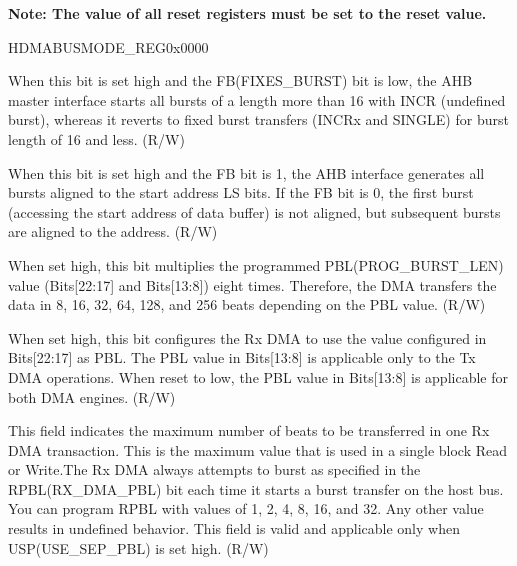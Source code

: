 
\textbf{Note:
The value of all reset registers must be set to the reset value.}

\begin{register}{H}{DMABUSMODE\_REG}{0x0000}\label{regdesc:DMABUSMODEREG}
%
%
%
%
%
%
%
%
%
%
%
%
\regnewline%
\begin{regdesc}\begin{reglist}
\item [DMAMIXEDBURST]When this bit is set high and the FB(FIXES\_BURST) bit is low, the AHB master interface starts all bursts of a length more than 16 with INCR (undefined burst), whereas it reverts to fixed burst transfers (INCRx and SINGLE) for burst length of 16 and less. (R/W)
\item [DMAADDRALIBEA]When this bit is set high and the FB bit is 1, the AHB interface generates all bursts aligned to the start address LS bits. If the FB bit is 0, the first burst (accessing the start address of data buffer) is not aligned, but subsequent bursts are aligned to the address. (R/W)
\item [PBLX8\_MODE]When set high, this bit multiplies the programmed PBL(PROG\_BURST\_LEN) value (Bits[22:17] and Bits[13:8]) eight times. Therefore, the DMA transfers the data in 8, 16, 32, 64, 128, and 256 beats depending on the PBL value. (R/W)
\item [USE\_SEP\_PBL]When set high, this bit configures the Rx DMA to use the value configured in Bits[22:17] as PBL. The PBL value in Bits[13:8] is applicable only to the Tx DMA operations. When reset to low, the PBL value in Bits[13:8] is applicable for both DMA engines. (R/W)
\item [RX\_DMA\_PBL]This field indicates the maximum number of beats to be transferred in one Rx DMA transaction. This is the maximum value that is used in a single block Read or Write.The Rx DMA always attempts to burst as specified in the RPBL(RX\_DMA\_PBL) bit each time it starts a burst transfer on the host bus. You can program RPBL with values of 1, 2, 4, 8, 16, and 32. Any other value results in undefined behavior. This field is valid and applicable only when USP(USE\_SEP\_PBL) is set high. (R/W)

\end{reglist}
\end{regdesc}
\end{register}
